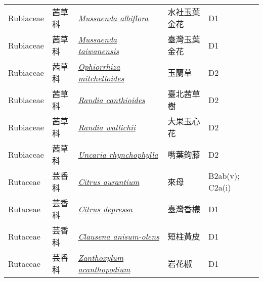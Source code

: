 {\begin{longtable}{p{2.5cm}p{2cm}p{5cm}p{2.5cm}p{3cm}}
    Rubiaceae & 茜草科 & \href{http://www.theplantlist.org/tpl1.1/search?q=Mussaenda+albiflora}{\textit{Mussaenda albiflora} } & 水社玉葉金花 & D1 \index{Mussaenda@\textit{Mussaenda}!albiflora@\textit{albiflora}}  \index{水社玉葉金花} \\
    Rubiaceae & 茜草科 & \href{http://www.theplantlist.org/tpl1.1/search?q=Mussaenda+taiwanensis}{\textit{Mussaenda taiwanensis} } & 臺灣玉葉金花 & D1 \index{Mussaenda@\textit{Mussaenda}!taiwanensis@\textit{taiwanensis}}  \index{臺灣玉葉金花} \\
    Rubiaceae & 茜草科 & \href{http://www.theplantlist.org/tpl1.1/search?q=Ophiorrhiza+mitchelloides}{\textit{Ophiorrhiza mitchelloides} } & 玉蘭草 & D2 \index{Ophiorrhiza@\textit{Ophiorrhiza}!mitchelloides@\textit{mitchelloides}}  \index{玉蘭草} \\
    Rubiaceae & 茜草科 & \href{http://www.theplantlist.org/tpl1.1/search?q=Randia+canthioides}{\textit{Randia canthioides} } & 臺北茜草樹 & D2 \index{Randia@\textit{Randia}!canthioides@\textit{canthioides}}  \index{臺北茜草樹} \\
    Rubiaceae & 茜草科 & \href{http://www.theplantlist.org/tpl1.1/search?q=Randia+wallichii}{\textit{Randia wallichii} } & 大果玉心花 & D2 \index{Randia@\textit{Randia}!wallichii@\textit{wallichii}}  \index{大果玉心花} \\
    Rubiaceae & 茜草科 & \href{http://www.theplantlist.org/tpl1.1/search?q=Uncaria+rhynchophylla}{\textit{Uncaria rhynchophylla} } & 嘴葉鉤藤 & D2 \index{Uncaria@\textit{Uncaria}!rhynchophylla@\textit{rhynchophylla}}  \index{嘴葉鉤藤} \\
    Rutaceae & 芸香科 & \href{http://www.theplantlist.org/tpl1.1/search?q=Citrus+aurantium}{\textit{Citrus aurantium} } & 來母 & B2ab(v); C2a(i) \index{Citrus@\textit{Citrus}!aurantium@\textit{aurantium}}  \index{來母} \\
    Rutaceae & 芸香科 & \href{http://www.theplantlist.org/tpl1.1/search?q=Citrus+depressa}{\textit{Citrus depressa} } & 臺灣香檬 & D1 \index{Citrus@\textit{Citrus}!depressa@\textit{depressa}}  \index{臺灣香檬} \\
    Rutaceae & 芸香科 & \href{http://www.theplantlist.org/tpl1.1/search?q=Clausena+anisum-olens}{\textit{Clausena anisum-olens} } & 短柱黃皮 & D1 \index{Clausena@\textit{Clausena}!anisum-olens@\textit{anisum-olens}}  \index{短柱黃皮} \\
    Rutaceae & 芸香科 & \href{http://www.theplantlist.org/tpl1.1/search?q=Zanthoxylum+acanthopodium}{\textit{Zanthoxylum acanthopodium} } & 岩花椒 & D1 \index{Zanthoxylum@\textit{Zanthoxylum}!acanthopodium@\textit{acanthopodium}}  \index{岩花椒} \\

\end{longtable}}
